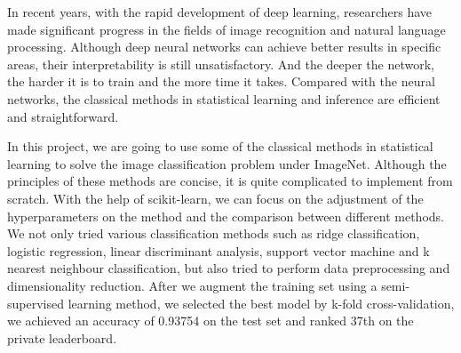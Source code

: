 \documentclass[10pt,journal,compsoc]{IEEEtran}
\begin{document}
\maketitle


\IEEEdisplaynontitleabstractindextext



%
\IEEEpeerreviewmaketitle




In recent years, with the rapid development of deep learning, researchers have made significant progress in the fields of image recognition and natural language processing. Although deep neural networks can achieve better results in specific areas, their interpretability is still unsatisfactory. And the deeper the network, the harder it is to train and the more time it takes. Compared with the neural networks, the classical methods in statistical learning and inference are efficient and straightforward.

In this project, we are going to use some of the classical methods in statistical learning to solve the image classification problem under ImageNet. Although the principles of these methods are concise, it is quite complicated to implement from scratch. With the help of scikit-learn\cite{scikit-learn}, we can focus on the adjustment of the hyperparameters on the method and the comparison between different methods. We not only tried various classification methods such as ridge classification, logistic regression, linear discriminant analysis, support vector machine and k nearest neighbour classification, but also tried to perform data preprocessing and dimensionality reduction. After we augment the training set using a semi-supervised learning method, we selected the best model by k-fold cross-validation, we achieved an accuracy of 0.93754 on the test set and ranked 37th on the private leaderboard.
\end{document}
